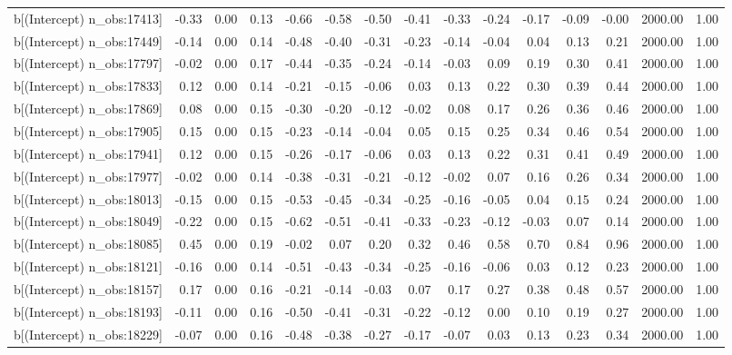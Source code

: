 \begin{table}[ht]
\begin{tabular}{rrrrrrrrrrrrrrr}
  b[(Intercept) n\_obs:17413] & -0.33 & 0.00 & 0.13 & -0.66 & -0.58 & -0.50 & -0.41 & -0.33 & -0.24 & -0.17 & -0.09 & -0.00 & 2000.00 & 1.00 \\ 
  b[(Intercept) n\_obs:17449] & -0.14 & 0.00 & 0.14 & -0.48 & -0.40 & -0.31 & -0.23 & -0.14 & -0.04 & 0.04 & 0.13 & 0.21 & 2000.00 & 1.00 \\ 
  b[(Intercept) n\_obs:17797] & -0.02 & 0.00 & 0.17 & -0.44 & -0.35 & -0.24 & -0.14 & -0.03 & 0.09 & 0.19 & 0.30 & 0.41 & 2000.00 & 1.00 \\ 
  b[(Intercept) n\_obs:17833] & 0.12 & 0.00 & 0.14 & -0.21 & -0.15 & -0.06 & 0.03 & 0.13 & 0.22 & 0.30 & 0.39 & 0.44 & 2000.00 & 1.00 \\ 
  b[(Intercept) n\_obs:17869] & 0.08 & 0.00 & 0.15 & -0.30 & -0.20 & -0.12 & -0.02 & 0.08 & 0.17 & 0.26 & 0.36 & 0.46 & 2000.00 & 1.00 \\ 
  b[(Intercept) n\_obs:17905] & 0.15 & 0.00 & 0.15 & -0.23 & -0.14 & -0.04 & 0.05 & 0.15 & 0.25 & 0.34 & 0.46 & 0.54 & 2000.00 & 1.00 \\ 
  b[(Intercept) n\_obs:17941] & 0.12 & 0.00 & 0.15 & -0.26 & -0.17 & -0.06 & 0.03 & 0.13 & 0.22 & 0.31 & 0.41 & 0.49 & 2000.00 & 1.00 \\ 
  b[(Intercept) n\_obs:17977] & -0.02 & 0.00 & 0.14 & -0.38 & -0.31 & -0.21 & -0.12 & -0.02 & 0.07 & 0.16 & 0.26 & 0.34 & 2000.00 & 1.00 \\ 
  b[(Intercept) n\_obs:18013] & -0.15 & 0.00 & 0.15 & -0.53 & -0.45 & -0.34 & -0.25 & -0.16 & -0.05 & 0.04 & 0.15 & 0.24 & 2000.00 & 1.00 \\ 
  b[(Intercept) n\_obs:18049] & -0.22 & 0.00 & 0.15 & -0.62 & -0.51 & -0.41 & -0.33 & -0.23 & -0.12 & -0.03 & 0.07 & 0.14 & 2000.00 & 1.00 \\ 
  b[(Intercept) n\_obs:18085] & 0.45 & 0.00 & 0.19 & -0.02 & 0.07 & 0.20 & 0.32 & 0.46 & 0.58 & 0.70 & 0.84 & 0.96 & 2000.00 & 1.00 \\ 
  b[(Intercept) n\_obs:18121] & -0.16 & 0.00 & 0.14 & -0.51 & -0.43 & -0.34 & -0.25 & -0.16 & -0.06 & 0.03 & 0.12 & 0.23 & 2000.00 & 1.00 \\ 
  b[(Intercept) n\_obs:18157] & 0.17 & 0.00 & 0.16 & -0.21 & -0.14 & -0.03 & 0.07 & 0.17 & 0.27 & 0.38 & 0.48 & 0.57 & 2000.00 & 1.00 \\ 
  b[(Intercept) n\_obs:18193] & -0.11 & 0.00 & 0.16 & -0.50 & -0.41 & -0.31 & -0.22 & -0.12 & 0.00 & 0.10 & 0.19 & 0.27 & 2000.00 & 1.00 \\ 
  b[(Intercept) n\_obs:18229] & -0.07 & 0.00 & 0.16 & -0.48 & -0.38 & -0.27 & -0.17 & -0.07 & 0.03 & 0.13 & 0.23 & 0.34 & 2000.00 & 1.00 \\ 

\end{tabular}
\end{table}
